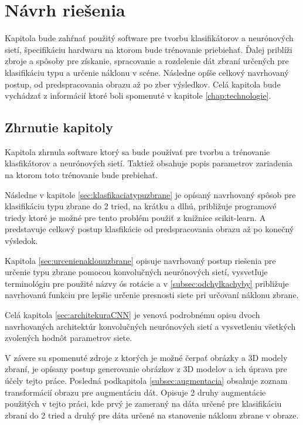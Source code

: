 \chapter{Návrh riešenia}
Kapitola bude zahŕnať použitý software pre tvorbu klasifikátorov a neurónových sietí, špecifikáciu hardwaru na ktorom bude trénovanie priebiehať.
Ďalej priblíži zbroje a spôsoby pre získanie, spracovanie a rozdelenie dát zbraní určených pre klasifikáciu typu a určenie náklonu v scéne.
Následne opíše celkový navrhovaný postup, od predspracovania obrazu až po zber výsledkov.
Celá kapitola bude vychádzať z informácií ktoré boli spomenuté v kapitole \ref{chap:technologie}.













\section{Zhrnutie kapitoly}

Kapitola zhrnula software ktorý sa bude používať pre tvorbu a trénovanie klasfikátorov a neurónových sietí.
Taktiež obsahuje popis parametrov zariadenia na ktorom toto trénovanie bude prebiehať.

Následne v kapitole \ref{sec:klasfikaciatypuzbrane} je opísaný navrhovaný spôsob pre klasifikáciu typu zbrane do 2 tried, na krátku a dlhú, približuje
    programové triedy ktoré je možné pre tento problém použiť z knižnice scikit-learn.
A predstavuje celkový postup klasfikácie od predspracovania obrazu až po konečný výsledok.

Kapitola \ref{sec:urcenienaklonuzbrane} opisuje navrhovaný postup riešenia pre určenie typu zbrane pomocou konvolučných neurónových sietí,
    vysvetľuje terminológiu pre použité názvy ós rotácie a v \ref{subsec:odchylkachyby} približuje navrhovanú funkciu pre lepšie určenie presnosti siete
    pri určovaní náklonu zbrane.

Celá kapitola \ref{sec:architekuraCNN} je venová podrobnému opisu dvoch navrhovaných architektúr konvolučných neurónových sietí a
    vysvetleniu všetkých zvolených hodnôt parametrov siete.

V závere su spomenuté zdroje z ktorých je možné čerpať obrázky a 3D modely zbraní, je opísany postup generovanie obrázkov z 3D modelov a ich úprava
    pre účely tejto práce.
Posledná podkapitola \ref{subsec:augmentacia} obsahuje zoznam transformácií obrazu pre augmentáciu dát.
Opisuje 2 druhy augmentácie použitých v tejto práci, kde prvý je zameraný na dáta určené pre klasifikáciu zbraní do 2 tried a druhý pre dáta
    určené na stanovenie náklonu zbrane v obraze.
